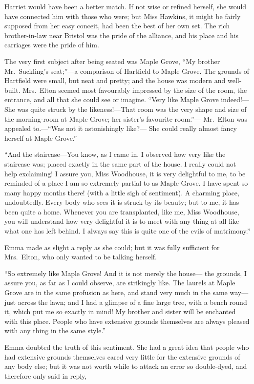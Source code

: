 Harriet would have been a better match.  If not wise or refined herself,
she would have connected him with those who were; but Miss Hawkins,
it might be fairly supposed from her easy conceit, had been the best
of her own set.  The rich brother-in-law near Bristol was the pride
of the alliance, and his place and his carriages were the pride
of him.

The very first subject after being seated was Maple Grove, ``My brother
Mr.\ Suckling's seat;''---a comparison of Hartfield to Maple Grove.
The grounds of Hartfield were small, but neat and pretty; and the
house was modern and well-built. Mrs.\ Elton seemed most favourably
impressed by the size of the room, the entrance, and all that she
could see or imagine.  ``Very like Maple Grove indeed!---She was quite
struck by the likeness!---That room was the very shape and size
of the morning-room at Maple Grove; her sister's favourite room.''---%
Mr.\ Elton was appealed to.---``Was not it astonishingly like?---%
She could really almost fancy herself at Maple Grove.''

``And the staircase---You know, as I came in, I observed how very like
the staircase was; placed exactly in the same part of the house.
I really could not help exclaiming!  I assure you, Miss Woodhouse,
it is very delightful to me, to be reminded of a place I am so
extremely partial to as Maple Grove.  I have spent so many happy
months there! (with a little sigh of sentiment). A charming place,
undoubtedly.  Every body who sees it is struck by its beauty;
but to me, it has been quite a home.  Whenever you are transplanted,
like me, Miss Woodhouse, you will understand how very delightful it
is to meet with any thing at all like what one has left behind.
I always say this is quite one of the evils of matrimony.''

Emma made as slight a reply as she could; but it was fully sufficient
for Mrs.\ Elton, who only wanted to be talking herself.

``So extremely like Maple Grove!  And it is not merely the house---%
the grounds, I assure you, as far as I could observe, are strikingly
like.  The laurels at Maple Grove are in the same profusion as here,
and stand very much in the same way---just across the lawn;
and I had a glimpse of a fine large tree, with a bench round it,
which put me so exactly in mind!  My brother and sister will be
enchanted with this place.  People who have extensive grounds
themselves are always pleased with any thing in the same style.''

Emma doubted the truth of this sentiment.  She had a great idea
that people who had extensive grounds themselves cared very little
for the extensive grounds of any body else; but it was not worth
while to attack an error so double-dyed, and therefore only said
in reply,

